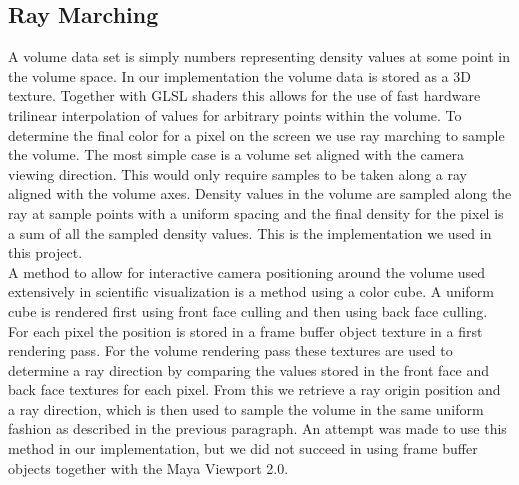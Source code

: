 \documentclass[11pt,twocolumn]{article}
\begin{document}
\subsection{Ray Marching}
A volume data set is simply numbers representing density values at some point in the volume space.
In our implementation the volume data is stored as a 3D texture.
Together with GLSL shaders this allows for the use of fast hardware trilinear interpolation of values for arbitrary points within the volume. To determine the final color for a pixel on the screen we use ray marching to sample the volume.
The most simple case is a volume set aligned with the camera viewing direction.
This would only require samples to be taken along a ray aligned with the volume axes.
Density values in the volume are sampled along the ray at sample points with a uniform spacing and the final density for the pixel is a sum of all the sampled density values.
This is the implementation we used in this project.
\\
A method to allow for interactive camera positioning around the volume used extensively in scientific visualization is a method using a color cube.
A uniform cube is rendered first using front face culling and then using back face culling.
For each pixel the position is stored in a frame buffer object texture in a first rendering pass.
For the volume rendering pass these textures are used to determine a ray direction by comparing the values stored in the front face and back face textures for each pixel. From this we retrieve a ray origin position and a ray direction, which is then used to sample the volume in the same uniform fashion as described in the previous paragraph. An attempt was made to use this method in our implementation, but we did not succeed in using frame buffer objects together with the Maya Viewport 2.0.


\endgroup
\newpage

\nocite{*}

\end{document}
